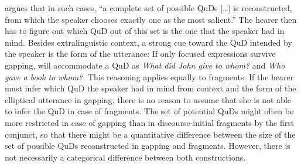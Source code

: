 \citet[477]{reich2007} argues that in such cases, ``a complete set of possible QuDs [\dots] is reconstructed, from which the speaker chooses exactly one as the most salient.'' The hearer then has to figure out which QuD out of this set is the one that the speaker had in mind. Besides extralinguistic context, a strong cue toward the QuD intended by the speaker is the form of the utterance: If only focused expressions survive gapping, \Last[a] will accommodate a QuD as \emph{What did John give to whom?}  and \Last[b] \emph{Who gave a book to whom?}. This reasoning applies equally to fragments: If the hearer must infer which QuD the speaker had in mind from context and the form of the elliptical utterance in gapping, there is no reason to assume that she is not able to infer the QuD in case of fragments. The set of potential QuDs might often be more restricted in case of gapping than in discourse-initial fragments by the first conjunct, so that there might be a quantitative difference between the size of the set of possible QuDs reconstructed in gapping and fragments. However, there is not necessarily a categorical difference between both constructions.

